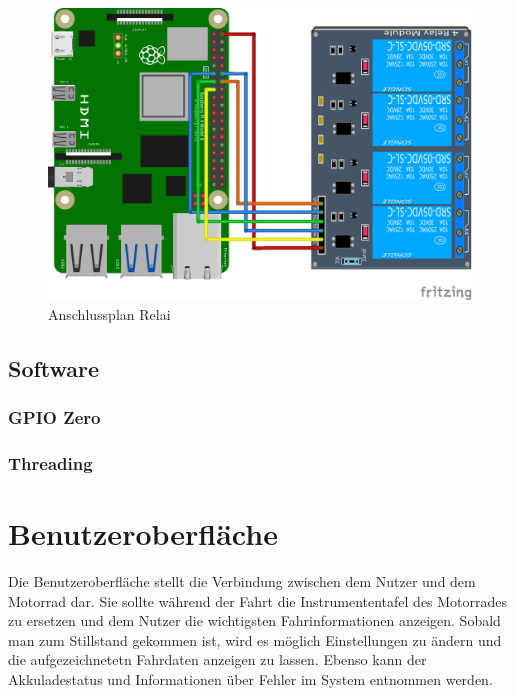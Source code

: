\begin{figure}[H]
	\begin{center}
		\includegraphics[scale=0.8]{figures/hcis/4ch_relai.png}
			\caption{Anschlussplan Relai}
			\label{fig:output}
	\end{center}
\end{figure}

\subsection{Software}

\subsubsection{GPIO Zero}

\subsubsection{Threading}

\newpage


\section{Benutzeroberfläche}
Die Benutzeroberfläche stellt die Verbindung zwischen dem Nutzer und dem Motorrad dar. Sie sollte während der Fahrt die Instrumententafel des Motorrades zu ersetzen und dem Nutzer die wichtigsten Fahrinformationen anzeigen. Sobald man zum Stillstand gekommen ist, wird es möglich Einstellungen zu ändern und die aufgezeichnetetn Fahrdaten anzeigen zu lassen. Ebenso kann der Akkuladestatus und Informationen über Fehler im System entnommen werden.

